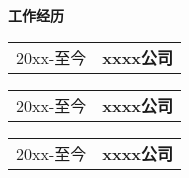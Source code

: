 \begin{flushleft}
  \Large\textbf{工作经历}
  \\[4mm]
  \normalsize{
    \begin{tabular}{p{} p{}}
      20xx-至今 & \textbf{xxxx公司}\\[4mm]
    \end{tabular}
    
    \begin{tabular}{p{} p{}}
      20xx-至今 & \textbf{xxxx公司}\\[4mm]
    \end{tabular}
    
    \begin{tabular}{p{} p{}}
      20xx-至今 & \textbf{xxxx公司}\\[4mm]
    \end{tabular}
  } 
\end{flushleft}